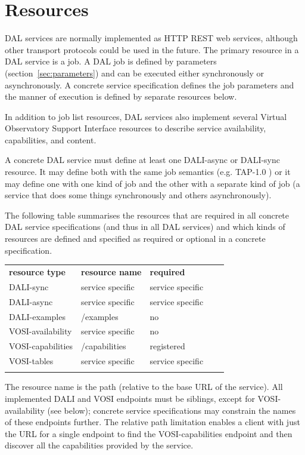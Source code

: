 \documentclass[11pt,letter]{ivoa}
\begin{document}
\section{Resources}
\label{sec:resources}
DAL services are normally implemented as HTTP REST \citep{fielding00}
web services, although
other transport protocols could be used in the future. The primary resource in
a DAL service is a job. A DAL job is defined by parameters
(section~\ref{sec:parameters}) and
can be executed either synchronously or asynchronously. A concrete service
specification defines the job parameters and the manner of execution is defined
by separate resources below.

In addition to job list resources, DAL services also implement several Virtual
Observatory Support Interface \citep{2017ivoa.spec.0524G} resources to describe
service availability, capabilities, and content.

A concrete DAL service must define at least one DALI-async or DALI-sync
resource. It may define both with the same job semantics (e.g. TAP-1.0
\citep{2010ivoa.spec.0327D}) or it may define one with one kind of job and the other with a
separate kind of job (a service that does some things synchronously and others
asynchronously).

The following table summarises the resources that are required in all concrete
DAL service specifications (and thus in all DAL services) and which kinds of
resources are defined and specified as required or optional in a concrete
specification.


\begin{tabular}{l l l l l}
\sptablerule
\textbf{resource type} & \textbf{resource name} & \textbf{required} \\
\sptablerule
DALI-sync & service specific & service specific & \\
DALI-async & service specific & service specific & \\
DALI-examples & /examples & no & \\
VOSI-availability & service specific & no & \\
VOSI-capabilities & /capabilities & registered & \\
VOSI-tables & service specific & service specific & \\
\sptablerule
\label{tab:resources}
\end{tabular}

The resource name is the path (relative to the base URL of the service). All implemented
DALI and VOSI endpoints must be siblings, except for VOSI-availability (see below);
concrete service specifications may constrain the names of these endpoints further.
The relative path limitation enables a client with just the URL for a single endpoint to
find the VOSI-capabilities endpoint and then discover all the capabilities
provided by the service.
\end{document}
